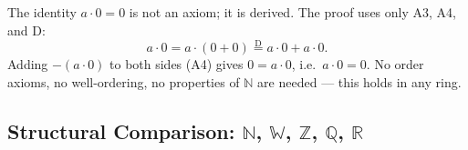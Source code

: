 \begin{remark*}
The identity $a \cdot 0 = 0$ is not an axiom; it is derived.
The proof uses only A3, A4, and D:
\[
a \cdot 0
= a \cdot (0 + 0)
\overset{\text{D}}{=} a \cdot 0 + a \cdot 0.
\]
Adding $-(a \cdot 0)$ to both sides (A4) gives $0 = a \cdot 0$, i.e.\ $a \cdot 0 = 0$.
No order axioms, no well-ordering, no properties of $\mathbb{N}$ are needed —
this holds in any ring.
\end{remark*}

\subsection*{Structural Comparison: $\mathbb{N}$, $\mathbb{W}$, $\mathbb{Z}$, $\mathbb{Q}$, $\mathbb{R}$}

